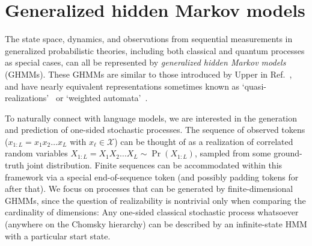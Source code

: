 \documentclass[prx,nofootinbib,onecolumn,showkeys,groupaddress,preprintnumbers,floatfix,
superscriptaddress]{revtex4-1}
\begin{document}





\section{Generalized hidden Markov models}
\label{sec:GHMMs}

The state space, dynamics, and observations from 
sequential measurements in 
generalized probabilistic theories,
including both classical and quantum processes as special cases,
can all be represented by
\emph{generalized hidden Markov models} (GHMMs).
These GHMMs are similar to those introduced by Upper in Ref.~\cite{Uppe97a}, and have
nearly equivalent representations sometimes known as `quasi-realizations'~\cite{Fanizza24_Quantum, Monras16_Quantum}
or `weighted automata'~\cite{Balle15_Canonical}.

To naturally connect with language models,
we are interested in
the generation and prediction of one-sided stochastic processes.  The sequence of observed tokens
($x_{1:L} = x_1 x_2 \dots x_L$ with $x_\ell \in \mathcal{X}$)
can be thought of as a realization of correlated random variables $X_{1:L} = X_1 X_2 \dots X_L \sim \Pr(X_{1:L})$,
sampled from some %
ground-truth joint distribution. 
Finite sequences can be accommodated within this framework via a special end-of-sequence token (and possibly padding tokens for after that). %
We %
focus on processes that can be generated by finite-dimensional GHMMs, since %
the question of realizability
is %
nontrivial only
when comparing the cardinality of dimensions:
Any one-sided classical stochastic process whatsoever (anywhere on the Chomsky hierarchy) can be described by an infinite-state HMM with a particular start state.
\end{document}
